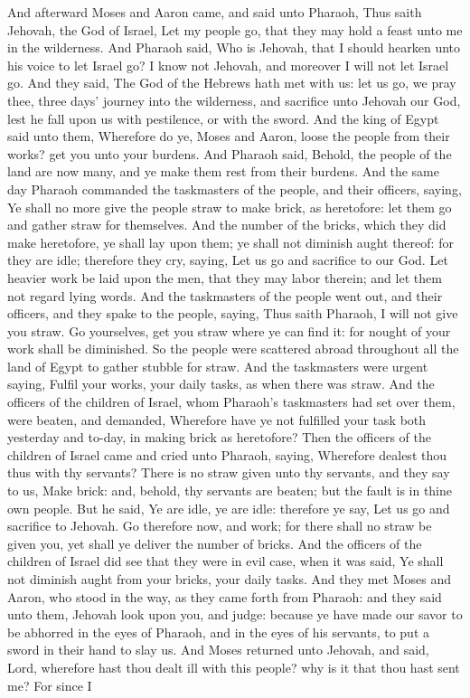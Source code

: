 And afterward Moses and Aaron came, and said unto Pharaoh, Thus saith Jehovah, the God of Israel, Let my people go, that they may hold a feast unto me in the wilderness. And Pharaoh said, Who is Jehovah, that I should hearken unto his voice to let Israel go? I know not Jehovah, and moreover I will not let Israel go. And they said, The God of the Hebrews hath met with us: let us go, we pray thee, three days’ journey into the wilderness, and sacrifice unto Jehovah our God, lest he fall upon us with pestilence, or with the sword. And the king of Egypt said unto them, Wherefore do ye, Moses and Aaron, loose the people from their works? get you unto your burdens. And Pharaoh said, Behold, the people of the land are now many, and ye make them rest from their burdens. And the same day Pharaoh commanded the taskmasters of the people, and their officers, saying, Ye shall no more give the people straw to make brick, as heretofore: let them go and gather straw for themselves. And the number of the bricks, which they did make heretofore, ye shall lay upon them; ye shall not diminish aught thereof: for they are idle; therefore they cry, saying, Let us go and sacrifice to our God. Let heavier work be laid upon the men, that they may labor therein; and let them not regard lying words.  And the taskmasters of the people went out, and their officers, and they spake to the people, saying, Thus saith Pharaoh, I will not give you straw. Go yourselves, get you straw where ye can find it: for nought of your work shall be diminished. So the people were scattered abroad throughout all the land of Egypt to gather stubble for straw. And the taskmasters were urgent saying, Fulfil your works, your daily tasks, as when there was straw. And the officers of the children of Israel, whom Pharaoh’s taskmasters had set over them, were beaten, and demanded, Wherefore have ye not fulfilled your task both yesterday and to-day, in making brick as heretofore?  Then the officers of the children of Israel came and cried unto Pharaoh, saying, Wherefore dealest thou thus with thy servants? There is no straw given unto thy servants, and they say to us, Make brick: and, behold, thy servants are beaten; but the fault is in thine own people. But he said, Ye are idle, ye are idle: therefore ye say, Let us go and sacrifice to Jehovah. Go therefore now, and work; for there shall no straw be given you, yet shall ye deliver the number of bricks. And the officers of the children of Israel did see that they were in evil case, when it was said, Ye shall not diminish aught from your bricks, your daily tasks. And they met Moses and Aaron, who stood in the way, as they came forth from Pharaoh: and they said unto them, Jehovah look upon you, and judge: because ye have made our savor to be abhorred in the eyes of Pharaoh, and in the eyes of his servants, to put a sword in their hand to slay us.  And Moses returned unto Jehovah, and said, Lord, wherefore hast thou dealt ill with this people? why is it that thou hast sent me? For since I 